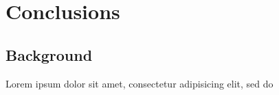 \chapter{Conclusions}
\label{chapter:conclusions}

\section{Background}

Lorem ipsum dolor sit amet, consectetur adipisicing elit, sed do


